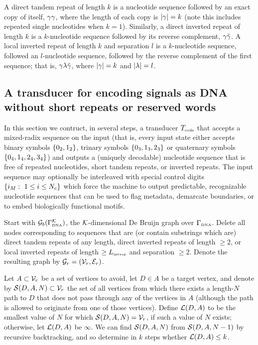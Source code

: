 \documentclass[english]{article}
\begin{document}
A direct tandem repeat of length $k$ is a nucleotide sequence followed by an exact copy of itself, $\gamma \gamma$, where the length of each copy is $|\gamma|=k$
(note this includes repeated single nucleotides when $k=1$).
Similarly, a direct inverted repeat of length $k$ is a $k$-nucleotide sequence followed by its reverse complement, $\gamma \tilde{\gamma}$.
A local inverted repeat of length $k$ and separation $l$ is a $k$-nucleotide sequence, followed an $l$-nucleotide sequence, followed by the reverse complement
of the first sequence; that is, $\gamma \lambda \tilde{\gamma}$, where $|\gamma|=k$ and $|\lambda|=l$.

\subsection{A transducer for encoding signals as DNA without short repeats or reserved words}

In this section we contruct, in several steps, a transducer $T_{\mbox{\tiny code}}$
that accepts a mixed-radix sequence on the input
(that is, every input state either accepts binary symbols $\{ 0_2, 1_2 \}$,
trinary symbols $\{ 0_3, 1_3, 2_3 \}$ or
quaternary symbols $\{ 0_4, 1_4, 2_4, 3_4 \}$)
and outputs a (uniquely decodable) nucleotide sequence that is free of
repeated nucleotides, short tandem repeats, or inverted repeats.
The input sequence may optionally be interleaved with special control digits
$\{ {i}_M:\ 1 \leq i \leq N_c \}$
which force the machine to output predictable, recognizable nucleotide sequences
that can be used to flag metadata, demarcate boundaries,
or to embed biologically functional motifs.

Start with ${\cal G}_b(\Gamma_{\mbox{\tiny DNA}}^{\cal K})$, the ${\cal K}$-dimensional De Bruijn graph over $\Gamma_{\mbox{\tiny DNA}}$.
Delete all nodes corresponding to sequences that are (or contain substrings which are)
direct tandem repeats of any length,
direct inverted repeats of length $\geq 2$,
or local inverted repeats of length $\geq L_{\mbox{\tiny invrep}}$ and separation $\geq 2$.
Denote the resulting graph by ${\cal G}_r = ({\cal V}_r,{\cal E}_r)$.

Let $A \subset {\cal V}_r$ be a set of vertices to avoid,
let $D \in A$ be a target vertex,
and denote by ${\cal S}(D,A,N) \subset {\cal V}_r$
the set of all vertices
from which there exists a length-$N$ path to $D$
that does not pass through any of the vertices in $A$
(although the path is allowed to originate from one of those vertices).
Define ${\cal L}(D,A)$ to be the smallest value of $N$ for which ${\cal S}(D,A,N) = {\cal V}_r$,
if such a value of $N$ exists; otherwise, let ${\cal L}(D,A)$ be $\infty$.
We can find ${\cal S}(D,A,N)$ from ${\cal S}(D,A,N-1)$ by recursive backtracking,
and so determine in $k$ steps whether ${\cal L}(D,A) \leq k$.
\end{document}
